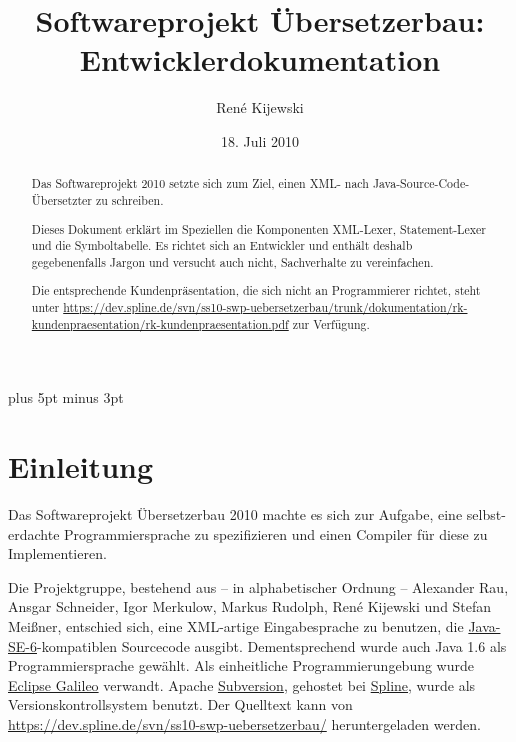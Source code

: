 \documentclass[10pt,a4paper,ngerman,titlepage,tocindentauto]{article}
\newcommand{\link}[1]{\href{#1}{#1}}
\begin{document}
	\begin{titlepage}
		\title{Softwareprojekt Übersetzerbau: \\ Entwicklerdokumentation} 
		\author{René Kijewski} 
		\date{18. Juli 2010}
		
		\maketitle
	\end{titlepage}
	
	\begin{abstract}
		Das Softwareprojekt 2010 setzte sich zum Ziel, einen XML- nach Java-Source-Code-Übersetzter
		zu schreiben.
		
		Dieses Dokument erklärt im Speziellen die Komponenten XML-Lexer, Statement-Lexer
		und die Symboltabelle. Es richtet sich an Entwickler und enthält deshalb gegebenenfalls
		Jargon und versucht auch nicht, Sachverhalte zu vereinfachen.
		
		Die entsprechende Kundenpräsentation, die sich nicht an Programmierer richtet, steht unter
		\link{https://dev.spline.de/svn/ss10-swp-uebersetzerbau/trunk/dokumentation/rk-kundenpraesentation/rk-kundenpraesentation.pdf}
		zur Verfügung.
	\end{abstract}

	{
		\pagestyle{empty}
		\tableofcontents
		\newpage
	}
	
	\parskip 7pt plus 5pt minus 3pt
	
	\setcounter{page}{1}
	\section{Einleitung}
		Das Softwareprojekt Übersetzerbau 2010 machte es sich zur Aufgabe, eine selbst-erdachte Programmiersprache
		zu spezifizieren und einen Compiler für diese zu Implementieren.
		
		Die Projektgruppe, bestehend aus – in alphabetischer Ordnung –
			Alexander Rau,
			Ansgar Schneider,
			Igor Merkulow,
			Markus Rudolph,
			René Kijewski und
			Stefan Meißner,
		entschied sich, eine XML-artige Eingabesprache zu benutzen, die
		\href{http://java.sun.com/javase/6/}{Java-SE-6}-kompatiblen Sourcecode ausgibt.
		Dementsprechend wurde auch Java 1.6 als Programmiersprache gewählt.
		Als einheitliche Programmierungebung wurde \href{http://www.eclipse.org/galileo/}{Eclipse Galileo} verwandt.
		Apache \href{http://subversion.apache.org/}{Subversion}, gehostet bei \href{http://dev.spline.de/}{Spline}, wurde als
		Versionskontrollsystem benutzt. Der Quelltext kann von \link{https://dev.spline.de/svn/ss10-swp-uebersetzerbau/}
		heruntergeladen werden.
		
\end{document}
